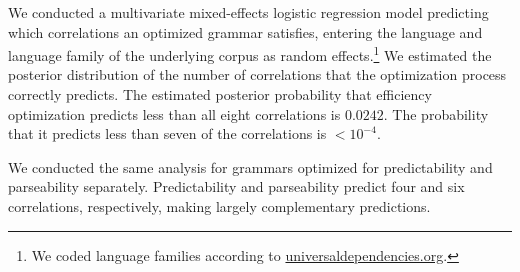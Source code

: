 \documentclass[9pt,twocolumn,twoside,lineno]{pnas-new}
\begin{document}
We conducted a multivariate mixed-effects logistic regression model predicting which correlations an optimized grammar satisfies, entering the language and language family of the underlying corpus as random effects.\footnote{We coded language families according to \url{universaldependencies.org}.}
We estimated the posterior distribution of the number of correlations that the optimization process correctly predicts.
The estimated posterior probability that efficiency optimization predicts less than all eight correlations is $0.0242$. The probability that it predicts less than seven of the correlations is $<10^{-4}$.

We conducted the same analysis for grammars optimized for predictability and parseability separately.
Predictability and parseability predict four and six correlations, respectively, making largely complementary predictions.
\end{document}
